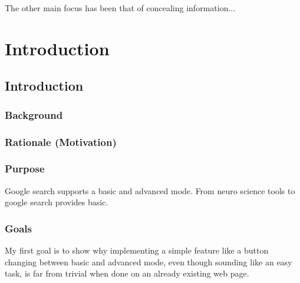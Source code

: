 \documentclass[english]{ifimaster}
\begin{document}
The other main focus has been that of concealing information...


\listoffigures
\part{Introduction}
\chapter{Introduction}
\section{Background}
\section{Rationale (Motivation)}



\section{Purpose}
Google search supports a basic and advanced mode. From neuro science\parencite{maldjian2003automated} tools to google search provides basic.



\section{Goals}
My first goal is to show why implementing a simple feature like a button changing between basic and advanced mode, even though sounding like an easy task, is far from trivial when done on an already existing web page. 
\end{document}
